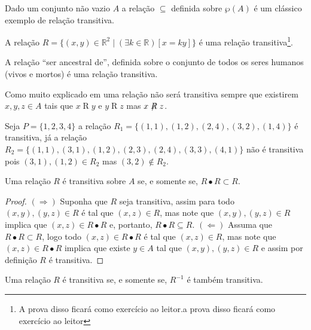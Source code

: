 \begin{example}
	Dado um conjunto não vazio $A$ a relação $\subseteq$ definida sobre $\wp(A)$ é um clássico exemplo de relação transitiva.
\end{example}

\begin{example}
	A relação $R = \{(x, y) \in \mathbb{R}^2 \mid (\exists k \in \mathbb{R})[x = ky]\}$ é uma relação transitiva\footnote{A prova disso ficará como exercício ao leitor.a prova disso ficará como exercício ao leitor}.
\end{example}

\begin{example}
	A relação ``ser ancestral de'', definida sobre o conjunto de todos os seres humanos (vivos e mortos) é uma relação transitiva.
\end{example}

Como muito explicado em \cite{abe1991-TC} uma relação não será transitiva sempre que existirem $x, y, z \in A$ tais que  $x \mathrel{R} y$ e $y \mathrel{R} z$ mas $x \centernot{R} z$.

\begin{example}
	Seja $P = \{1, 2, 3, 4\}$ a relação $R_1 = \{(1, 1), (1, 2), (2, 4), (3, 2), (1, 4)\}$ é transitiva, já a relação $R_2 = \{(1, 1), (3, 1), (1, 2), (2,3), (2, 4), (3, 3), (4, 1)\}$ não é transitiva pois $(3, 1), (1, 2) \in R_2$ mas $(3, 2) \notin R_2$.
\end{example}

\begin{theorem}\label{teo:CaracterizacaoRelacaoTransitivas}
	Uma relação $R$ é transitiva sobre $A$ se, e somente se, $R \bullet R \subset R$.
\end{theorem}

\begin{proof}
	$(\Rightarrow)$ Suponha que $R$ seja transitiva, assim para todo $(x, y), (y, z) \in R$ é tal que $(x, z) \in R$, mas note que $(x, y), (y, z) \in R$ implica que $(x, z) \in R \bullet R$ e, portanto, $R \bullet R \subseteq R$. $(\Leftarrow)$ Assuma que $R \bullet R \subset R$, logo todo $(x, z) \in R \bullet R$ é tal que $(x, z) \in R$, mas note que $(x, z) \in R \bullet R$ implica que existe $y \in A$ tal que $(x, y), (y, z) \in R$ e assim por definição $R$ é transitiva. 
\end{proof}

\begin{corollary}
	Uma relação $R$ é transitiva se, e somente se, $R^{-1}$ é também transitiva.
\end{corollary}

